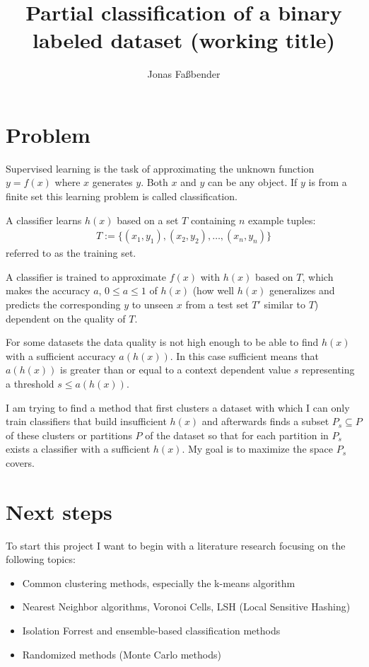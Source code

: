 \documentclass[12pt]{article}
\title{Partial classification of a binary labeled dataset
  (working title)}
\author{Jonas Fa{\ss}bender}
\date{}
\begin{document}
\maketitle

\section{Problem}

Supervised learning is the task of approximating the
unknown function $y = f(x)$ where $x$ generates
$y$. Both $x$ and $y$ can be any object. If $y$ is from a
finite set this learning problem is called classification.

A classifier learns $h(x)$ based on a set $T$ containing
$n$ example tuples:
\begin{align*}
T := \{(x_1, y_1), (x_2, y_2), \dots ,(x_n,y_n)\}
\end{align*}
referred to as the training set.\cite{ki}

A classifier is trained to approximate $f(x)$ with $h(x)$
based on $T$, which makes the accuracy $a$,
$0 \leq a \leq 1$ of $h(x)$ (how well $h(x)$ generalizes
and predicts the corresponding $y$ to unseen $x$ from a
test set $T'$ similar to $T$) dependent on the quality of
$T$.\cite{tc_data}

For some datasets the data quality is not high
enough to be able to find $h(x)$ with a sufficient
accuracy $a(h(x))$. In this case sufficient means that
$a(h(x))$ is greater than or equal to a context dependent
value $s$ representing a threshold $s \leq a(h(x))$.

I am trying to find a method that first clusters a dataset
with which I can only train classifiers that build
insufficient $h(x)$ and afterwards finds a subset
$P_s \subseteq P$ of these clusters or partitions $P$ of
the dataset so that for each partition in $P_s$ exists a
classifier with a sufficient $h(x)$. My goal is to maximize
the space $P_s$ covers.

\section{Next steps}

To start this project I want to begin with a literature
research focusing on the following topics:

\begin{itemize}

  \item Common clustering methods, especially the k-means
        algorithm

  \item Nearest Neighbor algorithms, Voronoi Cells, LSH
        (Local Sensitive Hashing)

  \item Isolation Forrest and ensemble-based classification
        methods

  \item Randomized methods (Monte Carlo methods)

\end{itemize}


\end{document}
